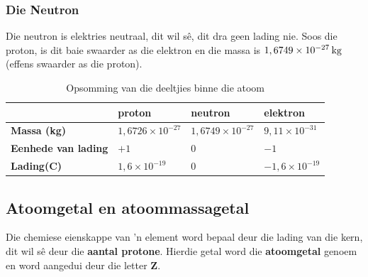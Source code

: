         
\subsubsection*{Die Neutron}
\nopagebreak
\label{m38745*id254468}
Die neutron is elektries neutraal, dit wil s\^{e}, dit dra geen lading nie. Soos die proton, is dit baie swaarder as die elektron en die massa is $1,6749\ensuremath{\times}{10}^{-27}\phantom{\rule{2pt}{0ex}}\text{kg}$ (effens swaarder as die proton).\par 
\label{m38745*notfhsst!!!underscore!!!id214}
          \begin{table}[H]
        \begin{center}
      \label{m38745*uid14}
    \noindent
      \begin{tabular}{|l|l|l|l|}\hline
         &
                    \textbf{proton}
                   &
                    \textbf{neutron}
                   &
                    \textbf{elektron} \\ \hline
                    \textbf{Massa (kg)}
                   &
        $1,6726\ensuremath{\times}{10}^{-27}$ &
        $1,6749\ensuremath{\times}{10}^{-27}$ &
        $9,11\ensuremath{\times}{10}^{-31}$ \\ \hline
                    \textbf{Eenhede van lading}
                   &
        $+1$ &
        $0$ &
        $-1$ \\ \hline
                    \textbf{Lading(C)}
                   &
        $1,6\ensuremath{\times}{10}^{-19}$ &
        $0$ &
        $-1,6\ensuremath{\times}{10}^{-19}$ \\ \hline
    \end{tabular}
      \end{center}
    \caption{Opsomming van die deeltjies binne die atoom}
\end{table}
    \par

    
\subsection*{Atoomgetal en atoommassagetal}
\nopagebreak
\label{m38745*id255805}
Die chemiese eienskappe van  'n element word bepaal deur die lading van die kern, dit wil sê deur die \textbf{aantal protone}. Hierdie getal word die \textbf{atoomgetal} genoem en word aangedui deur die letter \textbf{Z}.\par 


